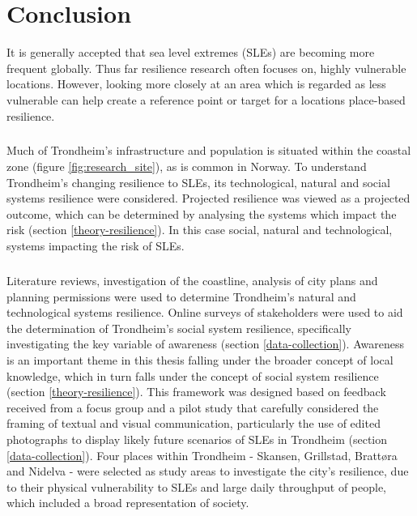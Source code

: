 \chapter{Conclusion}
It is generally accepted that sea level extremes (SLEs) are becoming more frequent globally. Thus far resilience research often focuses on, highly vulnerable locations. However, looking more closely at an area which is regarded as less vulnerable can help create a reference point or target for a locations place-based resilience.
\paragraph{}

Much of Trondheim's infrastructure and population is situated within the coastal zone (figure \ref{fig:research_site}), as is common in Norway. To understand Trondheim's changing resilience to SLEs, its technological, natural and social systems resilience were considered.  Projected resilience was viewed as a projected outcome, which can be determined by analysing the systems which impact the risk (section \ref{theory-resilience}). In this case social, natural and technological, systems impacting the risk of SLEs. 
\paragraph{}

Literature reviews, investigation of the coastline, analysis of city plans and planning permissions were used to determine Trondheim's natural and technological systems resilience. Online surveys of stakeholders were used to aid the determination of Trondheim's social system resilience, specifically investigating the key variable of awareness (section \ref{data-collection}). Awareness is an important theme in this thesis falling under the broader concept of local knowledge, which in turn falls under the concept of social system resilience (section \ref{theory-resilience}). This framework was designed based on feedback received from a focus group and a pilot study that carefully considered the framing of textual and visual communication, particularly the use of edited photographs to display likely future scenarios of SLEs in Trondheim (section \ref{data-collection}). Four places within Trondheim - Skansen, Grillstad, Brattøra and Nidelva - were selected as study areas to investigate the city's resilience, due to their physical vulnerability to SLEs and large daily throughput of people, which included a broad representation of society.

